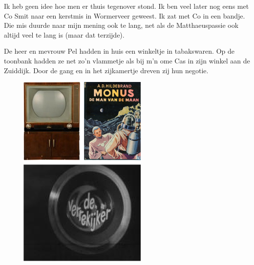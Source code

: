 \documentclass[12pt,twoside]{memoir}
\begin{document}
Ik heb geen idee hoe men er thuis tegenover stond. Ik ben veel later nog eens met Co Smit naar een kerstmis in Wormerveer geweest. Ik zat met Co in een bandje. Die mis duurde naar mijn mening ook te lang, net als de Matthaeuspassie ook altijd veel te lang is (maar dat terzijde).

De heer en mevrouw Pel hadden in huis een winkeltje in tabakswaren. Op de toonbank hadden ze net zo'n vlammetje als bij m'n ome Cas in zijn winkel aan de Zuiddijk. Door de gang en in het zijkamertje dreven zij hun negotie. 

\begin{figure}
\includegraphics[width=\textwidth]{img/ch5/1950s}
\caption*{\footnotesize }
\end{figure} 
\end{document}
